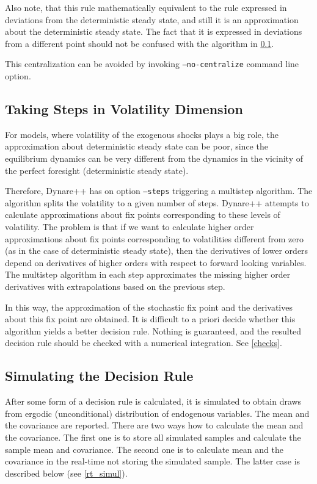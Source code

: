 \documentclass[10pt]{article}
\begin{document}
Also note, that this rule mathematically equivalent to the rule
expressed in deviations from the deterministic steady state, and still
it is an approximation about the deterministic steady state. The fact
that it is expressed in deviations from a different point should not
be confused with the algorithm in \ref{multistep_alg}.

This centralization can be avoided by invoking {\tt --no-centralize}
command line option.

\subsection{Taking Steps in Volatility Dimension}
\label{multistep_alg}

For models, where volatility of the exogenous shocks plays a big
role, the approximation about deterministic steady state can be poor,
since the equilibrium dynamics can be very different from the dynamics
in the vicinity of the perfect foresight (deterministic steady state).

Therefore, Dynare++ has on option {\tt --steps} triggering a multistep
algorithm. The algorithm splits the volatility to a given number of
steps. Dynare++ attempts to calculate approximations about fix points
corresponding to these levels of volatility. The problem is that if we
want to calculate higher order approximations about fix points
corresponding to volatilities different from zero (as in the case of
deterministic steady state), then the derivatives of lower orders
depend on derivatives of higher orders with respect to forward looking
variables. The multistep algorithm in each step approximates the
missing higher order derivatives with extrapolations based on the
previous step.

In this way, the approximation of the stochastic fix point and the
derivatives about this fix point are obtained. It is difficult to a
priori decide whether this algorithm yields a better decision
rule. Nothing is guaranteed, and the resulted decision rule should be
checked with a numerical integration. See \ref{checks}.

\subsection{Simulating the Decision Rule}

After some form of a decision rule is calculated, it is simulated to
obtain draws from ergodic (unconditional) distribution of endogenous
variables. The mean and the covariance are reported. There are two
ways how to calculate the mean and the covariance. The first one is to
store all simulated samples and calculate the sample mean and
covariance. The second one is to calculate mean and the covariance in
the real-time not storing the simulated sample. The latter case is
described below (see \ref{rt_simul}).
\end{document}
